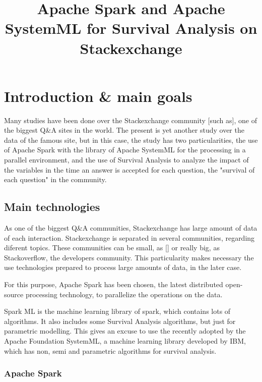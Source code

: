 


\title{Apache Spark and Apache SystemML for Survival Analysis on Stackexchange}

\maketitle


\chapter{Introduction & main goals}

Many studies have been done over the Stackexchange community [such as], one of the biggest Q&A sites in the world. The present is yet another study over the data of the famous site, but in this case, the study has two particularities, the use of Apache Spark with the library of Apache SystemML for the processing in a parallel environment, and the use of Survival Analysis to analyze the impact of the variables in the time an answer is accepted for each question, the "survival of each question" in the community.

\section{Main technologies}

As one of the biggest Q&A communities, Stackexchange has large amount of data of each interaction.
Stackexchange is separated in several communities, regarding diferent topics. These communities can be small, as [] or really big, as Stackoverflow, the developers community. This particularity makes necessary the use technologies prepared to process large amounts of data, in the later case.

For this purpose, Apache Spark has been chosen, the latest distributed open-source processing technology, to parallelize the operations on the data.

Spark ML is the machine learning library of spark, which contains lots of algorithms. It also includes some Survival Analysis algorithms, but just for parametric modelling. This gives an excuse to use the recently adopted by the Apache Foundation SystemML, a machine learning library developed by IBM, which has non, semi and parametric algorithms for survival analysis.


\subsection{Apache Spark}

